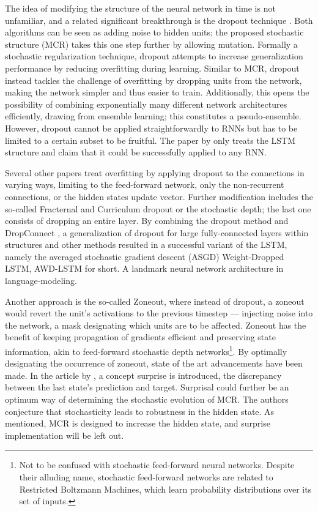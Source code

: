 The idea of modifying the structure of the neural network in time is not unfamiliar, and a related significant breakthrough is the dropout technique \cite{drop}. Both algorithms can be seen as adding noise to hidden units; the proposed stochastic structure (MCR) takes this one step further by allowing mutation. Formally a stochastic regularization technique, dropout attempts to increase generalization performance by reducing overfitting during learning. Similar to MCR, dropout instead tackles the challenge of overfitting by dropping units from the network, making the network simpler and thus easier to train. Additionally, this opens the possibility of combining exponentially many different network architectures efficiently, drawing from ensemble learning; this constitutes a pseudo-ensemble. However, dropout cannot be applied straightforwardly to RNNs \cite{dropno} but has to be limited to a certain subset\cite{droprnn} to be fruitful. The paper by \textcite{droprnn} only treats the LSTM structure and claim that it could be successfully applied to any RNN. 

Several other papers treat overfitting by applying dropout to the connections in varying ways, limiting to the feed-forward network, only the non-recurrent connections, or the hidden states update vector. Further modification includes the so-called Fracternal and Curriculum dropout or the stochastic depth; the last one consists of dropping an entire layer\cite{stochdep}. By combining the dropout method and DropConnect \cite{DropConnect}, a generalization of dropout for large fully-connected layers within structures and other methods resulted in a successful variant of the LSTM, namely the averaged stochastic gradient descent (ASGD) Weight-Dropped LSTM, AWD-LSTM for short. A landmark neural network architecture in language-modeling. 

Another approach is the so-called Zoneout\cite{zoneo}, where instead of dropout, a zoneout would revert the unit's activations to the previous timestep — injecting noise into the network, a mask designating which units are to be affected. Zoneout has the benefit of keeping propagation of gradients efficient and preserving state information, akin to feed-forward stochastic depth networks\footnote{Not to be confused with stochastic feed-forward neural networks. Despite their alluding name, stochastic feed-forward networks are related to Restricted Boltzmann Machines, which learn probability distributions over its set of inputs.}. By optimally designating the occurrence of zoneout, state of the art advancements have been made\cite{Zoneout}. In the article by \textcite{Zoneout}, a concept surprise is introduced, the discrepancy between the last state's prediction and target. Surprisal could further be an optimum way of determining the stochastic evolution of MCR. The authors \textcite{Zoneout} conjecture that stochasticity leads to robustness in the hidden state. As mentioned, MCR is designed to increase the hidden state, and surprise implementation will be left out.

